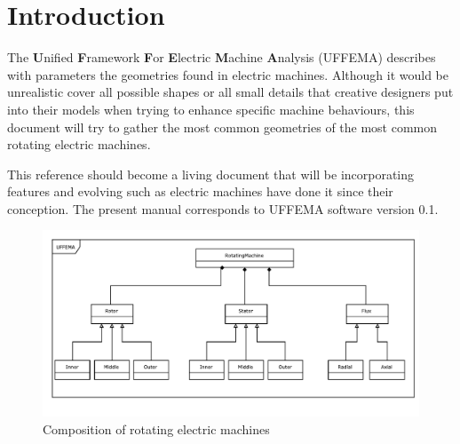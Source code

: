 \documentclass[justified]{tufte-book} %
\newcommand{\uffemaVersion}{0.1}
\begin{document}
\cleardoublepage
\chapter*{Introduction} %
\begin{fullwidth}
The \textbf{U}nified \textbf{F}ramework \textbf{F}or \textbf{E}lectric \textbf{M}achine \textbf{A}nalysis (UFFEMA) describes with parameters the geometries found in electric machines. Although it would be unrealistic cover all possible shapes or all small details that creative designers put into their models when trying to enhance specific machine behaviours, this document will try to gather the most common geometries of the most common rotating electric machines.

This reference should become a living document that will be incorporating features and evolving such as electric machines have done it since their conception. The present manual corresponds to UFFEMA software version \uffemaVersion.  
\end{fullwidth}
\begin{figure}[h]
\includegraphics[width=\linewidth]{Overview.pdf}
\caption{ Composition of rotating electric machines 
}
\label{fig:overview}
\end{figure}
\end{document}
